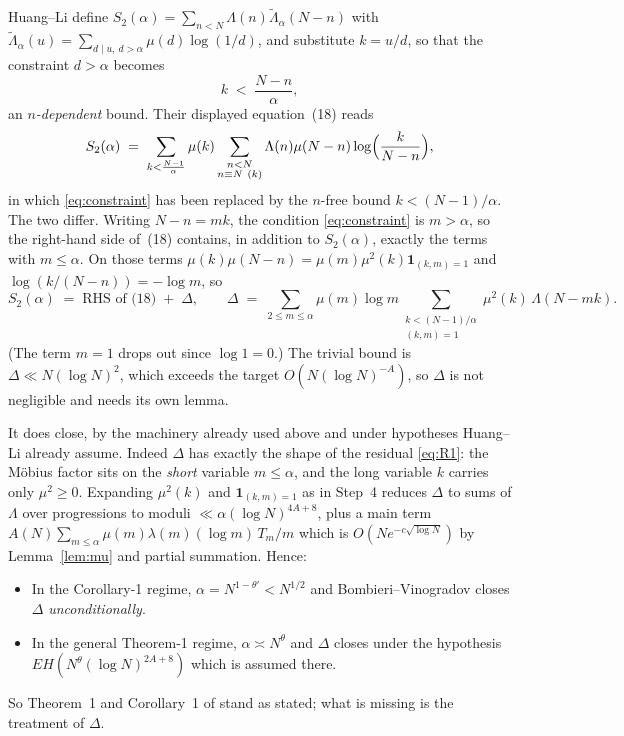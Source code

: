\documentclass[11pt,a4paper]{article}
\theoremstyle{plain}
\theoremstyle{definition}
\begin{document}
Huang--Li define
$S_2(\alpha)=\sum_{n<N}\Lambda(n)\tilde\Lambda_\alpha(N-n)$ with
$\tilde\Lambda_\alpha(u)=\sum_{d\mid u,\ d>\alpha}\mu(d)\log(1/d)$, and
substitute $k=u/d$, so that the constraint $d>\alpha$ becomes
\begin{equation}\label{eq:constraint}
  k \;<\; \frac{N-n}{\alpha},
\end{equation}
an \emph{$n$-dependent} bound. Their displayed equation~(18) reads
\[
  S_2(\alpha) \;=\; \sum_{k<\frac{N-1}{\alpha}}\mu(k)
    \sum_{\substack{n<N\\ n\equiv N\ (k)}}
    \Lambda(n)\mu(N-n)\log\Bigl(\frac{k}{N-n}\Bigr),
\]
in which \eqref{eq:constraint} has been replaced by the $n$-free bound
$k<(N-1)/\alpha$. The two differ. Writing $N-n=mk$, the condition
\eqref{eq:constraint} is $m>\alpha$, so the right-hand side of~(18)
contains, in addition to $S_2(\alpha)$, exactly the terms with
$m\le\alpha$. On those terms
$\mu(k)\mu(N-n)=\mu(m)\mu^2(k)\mathbf 1_{(k,m)=1}$ and
$\log(k/(N-n))=-\log m$, so
\begin{equation}\label{eq:Delta}
  S_2(\alpha) \;=\; \text{RHS of (18)} \;+\; \Delta,
  \qquad
  \Delta \;=\; \sum_{2\le m\le\alpha}\mu(m)\log m
    \sum_{\substack{k<(N-1)/\alpha\\ (k,m)=1}}\mu^2(k)\,\Lambda(N-mk).
\end{equation}
(The term $m=1$ drops out since $\log1=0$.) The trivial bound is
$\Delta\ll N(\log N)^2$, which exceeds the target
$O(N(\log N)^{-A})$, so $\Delta$ is not negligible and needs its own
lemma.

It does close, by the machinery already used above and under hypotheses
Huang--Li already assume. Indeed $\Delta$ has exactly the shape of the
residual \eqref{eq:R1}: the M\"obius factor sits on the \emph{short}
variable $m\le\alpha$, and the long variable $k$ carries only
$\mu^2\ge0$. Expanding $\mu^2(k)$ and $\mathbf 1_{(k,m)=1}$ as in Step~4
reduces $\Delta$ to sums of $\Lambda$ over progressions to moduli
$\ll\alpha(\log N)^{4A+8}$, plus a main term
$A(N)\sum_{m\le\alpha}\mu(m)\lambda(m)(\log m)\,T_m/m$ which is
$O(Ne^{-c\sqrt{\log N}})$ by Lemma~\ref{lem:mu} and partial summation.
Hence:
\begin{itemize}
\item In the Corollary-1 regime, $\alpha=N^{1-\theta'}<N^{1/2}$ and
      Bombieri--Vinogradov closes $\Delta$ \emph{unconditionally}.
\item In the general Theorem-1 regime, $\alpha\asymp N^{\theta}$ and
      $\Delta$ closes under the hypothesis
      $EH(N^{\theta}(\log N)^{2A+8})$ which is assumed there.
\end{itemize}
So Theorem~1 and Corollary~1 of \cite{HL} stand as stated; what is
missing is the treatment of $\Delta$.
\end{document}
